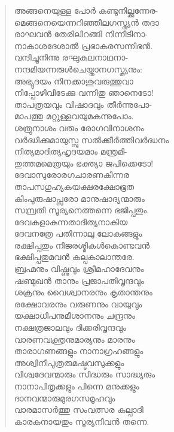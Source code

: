 \begin{verse}
അങ്ങനെയുള്ള പോര്‍ കണ്ടുനില്ക്കുന്നേര-\\
മെങ്ങനെയെന്നറിഞ്ഞീലഗസ്ത്യന്‍ തദാ\\
രാഘവന്‍ തേരിലിറങ്ങി നിന്നീടിനാ-\\
നാകാശദേശാല്‍ പ്രഭാകരസന്നിഭന്‍.\\
വന്ദിച്ചുനിന്നു രഘുകുലനാഥനാ-\\
നന്ദമിയന്നരുള്‍ചെയ്താനഗസ്ത്യനും:\\
അഭ്യുദയം നിനക്കാശുവരുത്തുവാ\\
നിപ്പോഴിവിടേക്കു വന്നിതു ഞാനെടോ!\\
താപത്രയവും വിഷാദവും തീര്‍ന്നുപോ-\\
മാപത്തു മറ്റുള്ളവയുമകന്നുപോം.\\
ശത്രുനാശം വരും രോഗവിനാശനം\\
വര്‍ദ്ധിക്കുമായുസ്സു സല്‍ക്കീര്‍ത്തിവര്‍ദ്ധനം\\
നിത്യമാദിത്യഹൃദയമാം മന്ത്രമി-\\
തുത്തമമെത്രയും ഭക്ത്യാ ജപിക്കെടോ!\\
ദേവാസുരോരഗചാരണകിന്നര\\
താപസഗുഹ്യകയക്ഷരക്ഷോഭൂത\\
കിംപുരുഷാപ്സരോ മാനുഷാദ്യന്മാരും\\
സമ്പ്രതി സൂര്യനെത്തന്നെ ഭജിപ്പതും.\\
ദേവകളാകുന്നതാദിത്യനാകിയ\\
ദേവനത്രേ പതിന്നാലു ലോകങ്ങളും\\
രക്ഷിപ്പതും നിജരശ്മികള്‍കൊണ്ടവന്‍\\
ഭക്ഷിപ്പതുമവന്‍ കല്പകാലാന്തരേ.\\
ബ്രഹ്മനും വിഷ്ണുവും ശ്രീമഹാദേവനും\\
ഷണ്മുഖന്‍ താനും പ്രജാപതിവൃന്ദവും\\
ശക്രനും വൈശ്വാനരനും കൃതാന്തനും\\
രക്ഷോവരനും വരുണനും വായുവും\\
യക്ഷാധിപനുമീശാനനും ചന്ദ്രനും\\
നക്ഷത്രജാലവും ദിക്കരിവൃന്ദവും\\
വാരണവക്ത്രനുമാര്യനും മാരനും\\
താരാഗണങ്ങളും നാനാഗ്രഹങ്ങളും\\
അശ്വിനീപുത്രരുമഷ്ടവസുക്കളും\\
വിശ്വദേവന്മാരും സിദ്ധരും സാദ്ധ്യരും\\
നാനാപിതൃക്കളും പിന്നെ മനുക്കളും\\
ദാനവന്മാരുമുരഗസമൂഹവും\\
വാരമാസര്‍ത്തു സംവത്സര കല്പാദി\\
കാരകനായതും സൂര്യനിവന്‍ തന്നെ.\\

\end{verse}

